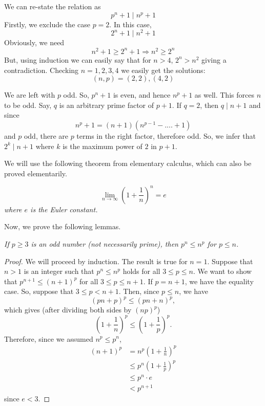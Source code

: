 \documentclass[problems.tex]{subfile}
\begin{document}
	\begin{solution}
		We can re-state the relation as \[p^n+1\mid n^p+1\]
		Firstly, we exclude the case $p=2$. In this case, \[2^n+1\mid n^2+1\]
		Obviously, we need \[n^2+1\ge2^n+1\Rightarrow n^2\ge2^n\]
		But, using induction we can easily say that for $n>4$, $2^n>n^2$ giving a contradiction. Checking $n=1,2,3,4$ we easily get the solutions: \[(n,p)=(2,2), (4,2)\]

		We are left with $p$ odd. So, $p^n+1$ is even, and hence $n^p+1$ as well. This forces $n$ to be odd. Say, $q$ is an arbitrary prime factor of $p+1$. If $q=2$, then $q\mid n+1$ and since \[n^p+1=(n+1)(n^{p-1}-....+1)\]
		and $p$ odd, there are $p$ terms in the right factor, therefore odd. So, we infer that $2^k\mid n+1$ where $k$ is the maximum power of $2$ in $p+1$.

		We will use the following theorem from elementary calculus, which can also be proved elementarily.

		\begin{theorem}\slshape
			\[\lim\limits_{n\to\infty}\left(1+\frac{1}{n}\right) ^ {n}=e\]
			where $e$ is the Euler constant.
		\end{theorem}

		Now, we prove the following lemmas.
		\begin{lemma}\slshape\label{lem:aditya-generalized}
			If $p \geq 3$ is an odd number (not necessarily prime), then $p^n\le n^p$ for $p\le n$.
		\end{lemma}

		\begin{proof}[Proof]
			We will proceed by induction. The result is true for $n=1$. Suppose that $n>1$ is an integer such that $p^n \leq n^p$ holds for all $3 \leq p \leq n$. We want to show that $p^{n+1} \leq (n+1)^p$ for all $3 \leq p \leq n+1$. If $p=n+1$, we have the equality case. So, suppose that $3 \leq p < n+1$. Then, since $p\le n$, we have \[(pn+p)^p\le (pn+n)^p,\] which gives (after dividing both sides by $(np)^p$) \[\left(1 + \frac{1}{n}\right)^p \leq  \left(1 + \frac{1}{p}\right)^p.\]  Therefore, since we assumed $n^p \leq p^n$,
				\begin{align*}
					(n+1)^p & = n^p\left(1+\frac{1}{n}\right)^p\\
							&\leq p^n\left(1+\frac{1}{p}\right)^p\\
							& \le p^n\cdot e\\
							& < p^{n+1}
				\end{align*}
		since $e<3$.
	\end{proof}


\end{solution}
\end{document}
